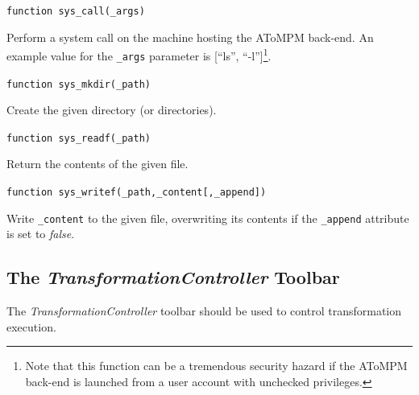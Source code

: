 \documentclass{article}
\numberwithin{equation}{section}
\numberwithin{figure}{section}
\begin{document}
\begin{center}	{\large \texttt{function sys\_call(\_args)}} \end{center}

Perform a system call on the machine hosting the AToMPM back-end. An example value for the \texttt{\_args} parameter is [``ls'', ``-l'']\footnote{Note that this function can be a tremendous security hazard if the AToMPM back-end is launched from a user account with unchecked privileges.}.\\
\vspace*{1em}


\begin{center}	{\large \texttt{function sys\_mkdir(\_path)}} \end{center}

Create the given directory (or directories).\\
\vspace*{1em}


\begin{center}	{\large \texttt{function sys\_readf(\_path)}} \end{center}

Return the contents of the given file.\\
\vspace*{1em}


\begin{center}	{\large \texttt{function sys\_writef(\_path,\_content[,\_append])}} \end{center}

Write \texttt{\_content} to the given file, overwriting its contents if the \texttt{\_append} attribute is set to \textit{false}.





\subsection{The \textit{TransformationController} Toolbar}
\label{ssec:transfctrltb}
The \textit{TransformationController} toolbar should be used to control transformation execution.\\
\end{document}
